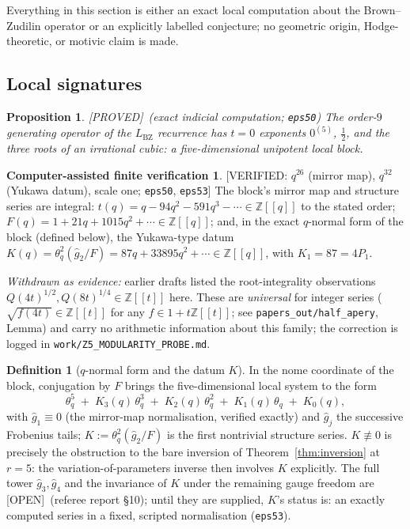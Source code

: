 \documentclass[11pt,reqno]{amsart}
\theoremstyle{plain}
\newtheorem{proposition}[theorem]{Proposition}
\theoremstyle{definition}
\newtheorem{definition}[theorem]{Definition}
\newtheorem{verification}[theorem]{Computer-assisted finite verification}
\theoremstyle{remark}
\newcommand{\Z}{\mathbb{Z}}
\newcommand{\Lbz}{L_{\mathrm{BZ}}}
\newcommand{\thq}{\theta_q}
\newcommand{\Proved}{\textup{\textsf{[PROVED]}}}
\newcommand{\VerifiedR}[1]{\textup{\textsf{[VERIFIED: #1]}}}
\newcommand{\Open}{\textup{\textsf{[OPEN]}}}
\begin{document}
Everything in this section is either an exact local computation about the
Brown--Zudilin operator or an explicitly labelled conjecture; no geometric
origin, Hodge-theoretic, or motivic claim is made.

\subsection{Local signatures}
\begin{proposition}\label{prop:sig}
\Proved\ (exact indicial computation; \texttt{eps50})\quad
The order-$9$ generating operator of the $\Lbz$ recurrence has $t=0$
exponents $0^{(5)}$, $\tfrac12$, and the three roots of an irrational
cubic: a five-dimensional unipotent local block.
\end{proposition}

\begin{verification}\label{ver:mirrorint}
\VerifiedR{$q^{26}$ (mirror map), $q^{32}$ (Yukawa datum), scale one;
\texttt{eps50}, \texttt{eps53}}\quad
The block's mirror map and structure series are integral:
$t(q)=q-94q^2-591q^3-\cdots\in\Z[[q]]$ to the stated order;
$F(q)=1+21q+1015q^2+\cdots\in\Z[[q]]$; and, in the exact $q$-normal form
of the block (defined below), the Yukawa-type datum
$K(q)=\thq^2(\hat g_2/F)=87q+33895q^2+\cdots\in\Z[[q]]$, with
$K_1=87=4P_1$.

\emph{Withdrawn as evidence:} earlier drafts listed the root-integrality
observations $Q(4t)^{1/2},Q(8t)^{1/4}\in\Z[[t]]$ here. These are
\emph{universal} for integer series ($\sqrt{f(4t)}\in\Z[[t]]$ for any
$f\in1+t\Z[[t]]$; see \texttt{papers\_out/half\_apery}, Lemma) and carry
no arithmetic information about this family; the correction is logged in
\texttt{work/Z5\_MODULARITY\_PROBE.md}.
\end{verification}

\begin{definition}[$q$-normal form and the datum $K$]\label{def:normal}
In the nome coordinate of the block, conjugation by $F$ brings the
five-dimensional local system to the form
\[
\thq^{5}\;+\;K_3(q)\,\thq^{3}\;+\;K_2(q)\,\thq^{2}\;+\;K_1(q)\,\thq
\;+\;K_0(q),
\]
with $\hat g_1\equiv0$ (the mirror-map normalisation, verified exactly)
and $\hat g_j$ the successive Frobenius tails; $K:=\thq^2(\hat g_2/F)$ is
the first nontrivial structure series. $K\not\equiv0$ is precisely the
obstruction to the bare inversion of Theorem~\ref{thm:inversion} at
$r=5$: the variation-of-parameters inverse then involves $K$ explicitly.
The full tower $\hat g_3,\hat g_4$ and the invariance of $K$ under the
remaining gauge freedom are \Open\ (referee report \S10); until they are
supplied, $K$'s status is: an exactly computed series in a fixed,
scripted normalisation (\texttt{eps53}).
\end{definition}
\end{document}
